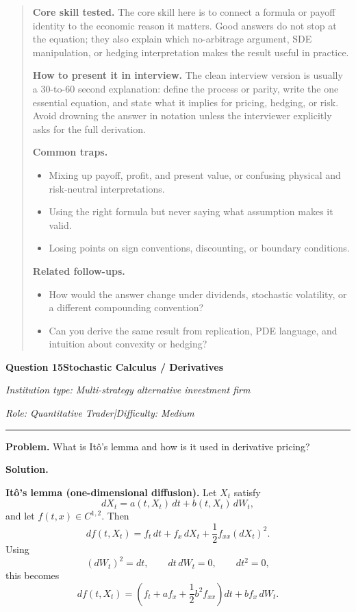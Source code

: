 \documentclass[11pt,letterpaper,openany]{book}
\newenvironment{EditorialNote}
  {\begin{quote}\small\setlength{\parskip}{0.25em}}
  {\end{quote}}
\newcommand{\QuestionSpacer}{\vspace{0.4em}}
\newcommand{\InterviewQuestionHeader}[5]{%
  \vspace{1.0em}%
  {\large\bfseries #1\enspace #4\par}%
  {\small\itshape Institution type: #2\par}%
  {\small\itshape Role: #3\enspace |\enspace Difficulty: #5\par}%
  \vspace{0.25em}\hrule\vspace{0.45em}%
}
\begin{document}
\begin{EditorialNote}


\textbf{Core skill tested.} The core skill here is to connect a formula or payoff identity to the economic reason it matters. Good answers do not stop at the equation; they also explain which no-arbitrage argument, SDE manipulation, or hedging interpretation makes the result useful in practice.

\textbf{How to present it in interview.} The clean interview version is usually a 30-to-60 second explanation: define the process or parity, write the one essential equation, and state what it implies for pricing, hedging, or risk. Avoid drowning the answer in notation unless the interviewer explicitly asks for the full derivation.

\textbf{Common traps.}
\begin{itemize}
\item Mixing up payoff, profit, and present value, or confusing physical and risk-neutral interpretations.
\item Using the right formula but never saying what assumption makes it valid.
\item Losing points on sign conventions, discounting, or boundary conditions.
\end{itemize}

\textbf{Related follow-ups.}
\begin{itemize}
\item How would the answer change under dividends, stochastic volatility, or a different compounding convention?
\item Can you derive the same result from replication, PDE language, and intuition about convexity or hedging?
\end{itemize}


\end{EditorialNote}
\QuestionSpacer

\InterviewQuestionHeader{Question 15}{Multi-strategy alternative investment firm}{Quantitative Trader}{Stochastic Calculus / Derivatives}{Medium}
\textbf{Problem.} What is Itô's lemma and how is it used in derivative pricing?

\textbf{Solution.}

\textbf{Itô's lemma (one-dimensional diffusion).} Let \(X_t\) satisfy
\[
dX_t = a(t,X_t)\,dt + b(t,X_t)\,dW_t,
\]
and let \(f(t,x)\in C^{1,2}\). Then
\[
df(t,X_t)
=
f_t\,dt + f_x\,dX_t + \frac12 f_{xx}(dX_t)^2.
\]
Using
\[
(dW_t)^2=dt,\qquad dt\,dW_t=0,\qquad dt^2=0,
\]
this becomes
\[
df(t,X_t)
=
\left(f_t + a f_x + \frac12 b^2 f_{xx}\right)dt + b f_x\,dW_t.
\]
\end{document}
